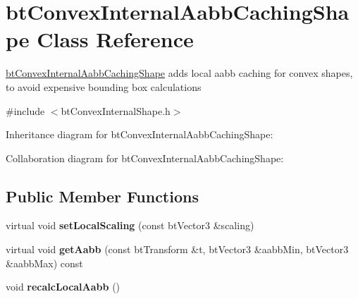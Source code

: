 \hypertarget{classbt_convex_internal_aabb_caching_shape}{\section{bt\+Convex\+Internal\+Aabb\+Caching\+Shape Class Reference}
\label{classbt_convex_internal_aabb_caching_shape}
}


\hyperlink{classbt_convex_internal_aabb_caching_shape}{bt\+Convex\+Internal\+Aabb\+Caching\+Shape} adds local aabb caching for convex shapes, to avoid expensive bounding box calculations  




{\ttfamily \#include $<$bt\+Convex\+Internal\+Shape.\+h$>$}



Inheritance diagram for bt\+Convex\+Internal\+Aabb\+Caching\+Shape\+:


Collaboration diagram for bt\+Convex\+Internal\+Aabb\+Caching\+Shape\+:
\subsection*{Public Member Functions}
\begin{DoxyCompactItemize}
\item 
\hypertarget{classbt_convex_internal_aabb_caching_shape_a21985e402d4226e8ef1ac616dbbc250d}{virtual void {\bfseries set\+Local\+Scaling} (const bt\+Vector3 \&scaling)}\label{classbt_convex_internal_aabb_caching_shape_a21985e402d4226e8ef1ac616dbbc250d}

\item 
\hypertarget{classbt_convex_internal_aabb_caching_shape_a3bc963048732c910e3a7005c2919fba8}{virtual void {\bfseries get\+Aabb} (const bt\+Transform \&t, bt\+Vector3 \&aabb\+Min, bt\+Vector3 \&aabb\+Max) const }\label{classbt_convex_internal_aabb_caching_shape_a3bc963048732c910e3a7005c2919fba8}

\item 
\hypertarget{classbt_convex_internal_aabb_caching_shape_a814b5ec6b3b24265e9a6e6e4dbbeb575}{void {\bfseries recalc\+Local\+Aabb} ()}\label{classbt_convex_internal_aabb_caching_shape_a814b5ec6b3b24265e9a6e6e4dbbeb575}

\end{DoxyCompactItemize}
